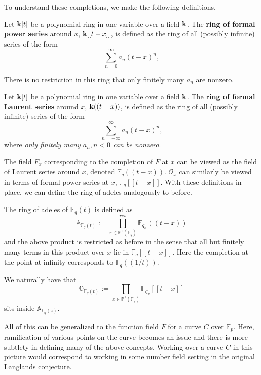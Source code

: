 To understand these completions, we make the following definitions.
\begin{defn}
	Let $\mathbf{k}[t]$ be a polynomial ring in one variable over a field $\mathbf{k}$. The \textbf{ring of formal power series} around $x$, $\mathbf{k}[[t-x]]$, is defined as the ring of all (possibly infinite) series of the form
	\[
		\sum_{n=0}^\infty a_n (t-x)^n,
	\]
\end{defn}
\begin{nb}
	There is no restriction in this ring that only finitely many $a_n$ are nonzero. 
\end{nb}

\begin{defn}
	Let $\mathbf{k}[t]$ be a polynomial ring in one variable over a field $\mathbf{k}$. The \textbf{ring of formal Laurent series} around $x$, $\mathbf{k}((t-x))$, is defined as the ring of all (possibly infinite) series of the form
	\[
		\sum_{n=-\infty}^\infty a_n (t-x)^n,
	\]
	where \emph{only finitely many $a_n, n<0$ can be nonzero}.
\end{defn}

The field $F_x$ corresponding to the completion of $F$ at $x$ can be viewed as the field of Laurent series around $x$, denoted $\mathbb F_q((t-x))$. $\mathcal O_x$ can similarly be viewed in terms of formal power series at $x$, $\mathbb F_q [[t-x]]$. With these definitions in place, we can define the ring of adeles analogously to before.

\begin{defn}
	The ring of adeles of $\mathbb F_q(t)$ is defined as 
	\[
		\mathbb A_{\mathbb F_q(t)} := \prod_{x \in \mathbb P^1(\mathbb F_q)}^{res} \mathbb F_{q_x}((t-x))
	\]
	and the above product is restricted as before in the sense that all but finitely many terms in this product over $x$ lie in $\mathbb F_q [[t-x]]$. Here the completion at the point at infinity corresponds to $\mathbb F_q ((1/t))$.
\end{defn}
We naturally have that 
\[
	\mathbb O_{\mathbb F_q(t)} := 	\prod_{x \in \mathbb P^1(\mathbb F_q)} \mathbb F_{q_x}[[t-x]]
\]
sits inside $\mathbb A_{\mathbb F_q(z)}$.

All of this can be generalized to the function field $F$ for a curve $C$ over $\mathbb F_p$. Here, ramification of various points on the curve becomes an issue and there is more subtlety in defining many of the above concepts. Working over a curve $C$ in this picture would correspond to working in some number field setting in the original Langlands conjecture. 

